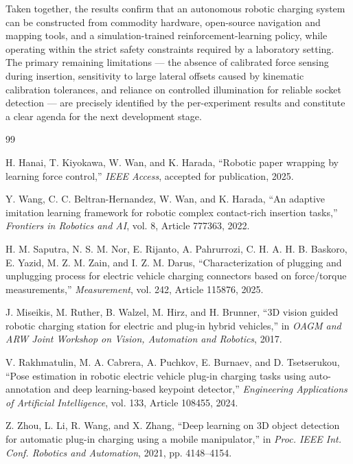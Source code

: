 \documentclass[10pt]{article}
\begin{document}
Taken together, the results confirm that an autonomous robotic charging system can be constructed from commodity hardware, open-source navigation and mapping tools, and a simulation-trained reinforcement-learning policy, while operating within the strict safety constraints required by a laboratory setting. The primary remaining limitations --- the absence of calibrated force sensing during insertion, sensitivity to large lateral offsets caused by kinematic calibration tolerances, and reliance on controlled illumination for reliable socket detection --- are precisely identified by the per-experiment results and constitute a clear agenda for the next development stage.

\newpage

\begin{thebibliography}{99}

H. Hanai, T. Kiyokawa, W. Wan, and K. Harada, ``Robotic paper wrapping by learning force control,'' \emph{IEEE Access}, accepted for publication, 2025.

Y. Wang, C. C. Beltran-Hernandez, W. Wan, and K. Harada, ``An adaptive imitation learning framework for robotic complex contact-rich insertion tasks,'' \emph{Frontiers in Robotics and AI}, vol. 8, Article 777363, 2022.

H. M. Saputra, N. S. M. Nor, E. Rijanto, A. Pahrurrozi, C. H. A. H. B. Baskoro, E. Yazid, M. Z. M. Zain, and I. Z. M. Darus, ``Characterization of plugging and unplugging process for electric vehicle charging connectors based on force/torque measurements,'' \emph{Measurement}, vol. 242, Article 115876, 2025.

J. Miseikis, M. Ruther, B. Walzel, M. Hirz, and H. Brunner, ``3D vision guided robotic charging station for electric and plug-in hybrid vehicles,'' in \emph{OAGM and ARW Joint Workshop on Vision, Automation and Robotics}, 2017.

V. Rakhmatulin, M. A. Cabrera, A. Puchkov, E. Burnaev, and D. Tsetserukou, ``Pose estimation in robotic electric vehicle plug-in charging tasks using auto-annotation and deep learning-based keypoint detector,'' \emph{Engineering Applications of Artificial Intelligence}, vol. 133, Article 108455, 2024.

Z. Zhou, L. Li, R. Wang, and X. Zhang, ``Deep learning on 3D object detection for automatic plug-in charging using a mobile manipulator,'' in \emph{Proc. IEEE Int. Conf. Robotics and Automation}, 2021, pp. 4148--4154.


\end{thebibliography}
\end{document}

